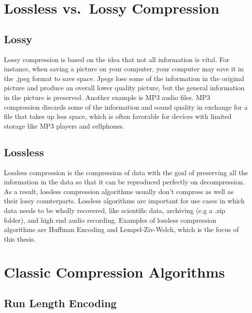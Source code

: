 \documentclass[12pt,twoside]{reedthesis}
\begin{document}
\hypertarget{lossless-vs.-lossy-compression}{%
\section{Lossless vs.~Lossy Compression}\label{lossless-vs.-lossy-compression}}

\hypertarget{lossy}{%
\subsection{Lossy}\label{lossy}}

Lossy compression is based on the idea that not all information is vital. For instance, when saving a picture on your computer, your computer may save it in the .jpeg format to save space. Jpegs lose some of the information in the original picture and produce an overall lower quality picture, but the general information in the picture is preserved. Another example is MP3 audio files. MP3 compression discards some of the information and sound quality in exchange for a file that takes up less space, which is often favorable for devices with limited storage like MP3 players and cellphones.

\hypertarget{lossless}{%
\subsection{Lossless}\label{lossless}}

Lossless compression is the compression of data with the goal of preserving all the information in the data so that it can be reproduced perfectly on decompression. As a result, lossless compression algorithms usually don't compress as well as their lossy counterparts. Lossless algorithms are important for use cases in which data needs to be wholly recovered, like scientific data, archiving (e.g a .zip folder), and high end audio recording. Examples of lossless compression algorithms are Huffman Encoding and Lempel-Ziv-Welch, which is the focus of this thesis.

\hypertarget{classic-compression-algorithms}{%
\section{Classic Compression Algorithms}\label{classic-compression-algorithms}}

\hypertarget{run-length-encoding}{%
\subsection{Run Length Encoding}\label{run-length-encoding}}
\end{document}
